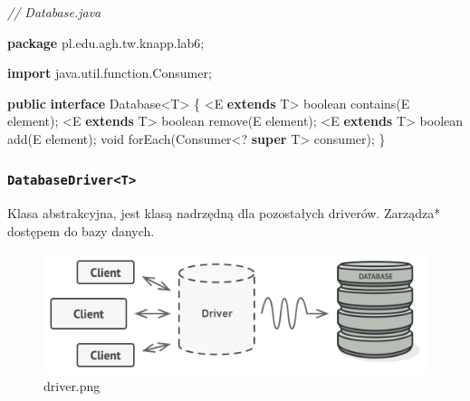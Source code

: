 \documentclass[11pt]{article}
\newenvironment{Shaded}{}{}
\newcommand{\KeywordTok}[1]{\textcolor[rgb]{0.00,0.44,0.13}{\textbf{{#1}}}}
\newcommand{\DataTypeTok}[1]{\textcolor[rgb]{0.56,0.13,0.00}{{#1}}}
\newcommand{\CommentTok}[1]{\textcolor[rgb]{0.38,0.63,0.69}{\textit{{#1}}}}
\newcommand{\FunctionTok}[1]{\textcolor[rgb]{0.02,0.16,0.49}{{#1}}}
\newcommand{\NormalTok}[1]{{#1}}
\newcommand{\ImportTok}[1]{{#1}}
\newcommand{\OperatorTok}[1]{\textcolor[rgb]{0.40,0.40,0.40}{{#1}}}
\begin{document}
\begin{Shaded}
\begin{Highlighting}[]
\CommentTok{// Database.java}

\KeywordTok{package}\ImportTok{ pl}\OperatorTok{.}\ImportTok{edu}\OperatorTok{.}\ImportTok{agh}\OperatorTok{.}\ImportTok{tw}\OperatorTok{.}\ImportTok{knapp}\OperatorTok{.}\ImportTok{lab6}\OperatorTok{;}

\KeywordTok{import} \ImportTok{java}\OperatorTok{.}\ImportTok{util}\OperatorTok{.}\ImportTok{function}\OperatorTok{.}\ImportTok{Consumer}\OperatorTok{;}

\KeywordTok{public} \KeywordTok{interface}\NormalTok{ Database}\OperatorTok{\textless{}}\NormalTok{T}\OperatorTok{\textgreater{}} \OperatorTok{\{}
    \OperatorTok{\textless{}}\NormalTok{E }\KeywordTok{extends}\NormalTok{ T}\OperatorTok{\textgreater{}} \DataTypeTok{boolean} \FunctionTok{contains}\OperatorTok{(}\NormalTok{E element}\OperatorTok{);}
    \OperatorTok{\textless{}}\NormalTok{E }\KeywordTok{extends}\NormalTok{ T}\OperatorTok{\textgreater{}} \DataTypeTok{boolean} \FunctionTok{remove}\OperatorTok{(}\NormalTok{E element}\OperatorTok{);}
    \OperatorTok{\textless{}}\NormalTok{E }\KeywordTok{extends}\NormalTok{ T}\OperatorTok{\textgreater{}} \DataTypeTok{boolean} \FunctionTok{add}\OperatorTok{(}\NormalTok{E element}\OperatorTok{);}
    \DataTypeTok{void} \FunctionTok{forEach}\OperatorTok{(}\NormalTok{Consumer}\OperatorTok{\textless{}?} \KeywordTok{super}\NormalTok{ T}\OperatorTok{\textgreater{}}\NormalTok{ consumer}\OperatorTok{);}
\OperatorTok{\}}
\end{Highlighting}
\end{Shaded}

    \hypertarget{databasedrivert}{%
\subsubsection{\texorpdfstring{\texttt{DatabaseDriver\textless{}T\textgreater{}}}{DatabaseDriver\textless T\textgreater{}}}\label{databasedrivert}}

Klasa abstrakcyjna, jest klasą nadrzędną dla pozostałych driverów.
Zarządza* dostępem do bazy danych.

\begin{figure}
\centering
\includegraphics{image.png}
\caption{driver.png}
\end{figure}
\end{document}
